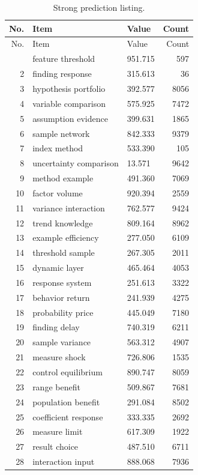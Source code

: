 \documentclass[11pt]{report}
\begin{document}
\begin{longtable}{rllr}\caption{Strong prediction listing.}\label{tab:l6}\\\toprule No. & Item & Value & Count \\ \midrule \endfirsthead\toprule No. & Item & Value & Count \\ \midrule \endhead\bottomrule \endfoot
1 & feature threshold & 951.715 & 597 \\
2 & finding response & 315.613 & 36 \\
3 & hypothesis portfolio & 392.577 & 8056 \\
4 & variable comparison & 575.925 & 7472 \\
5 & assumption evidence & 399.631 & 1865 \\
6 & sample network & 842.333 & 9379 \\
7 & index method & 533.390 & 105 \\
8 & uncertainty comparison & 13.571 & 9642 \\
9 & method example & 491.360 & 7069 \\
10 & factor volume & 920.394 & 2559 \\
11 & variance interaction & 762.577 & 9424 \\
12 & trend knowledge & 809.164 & 8962 \\
13 & example efficiency & 277.050 & 6109 \\
14 & threshold sample & 267.305 & 2011 \\
15 & dynamic layer & 465.464 & 4053 \\
16 & response system & 251.613 & 3322 \\
17 & behavior return & 241.939 & 4275 \\
18 & probability price & 445.049 & 7180 \\
19 & finding delay & 740.319 & 6211 \\
20 & sample variance & 563.312 & 4907 \\
21 & measure shock & 726.806 & 1535 \\
22 & control equilibrium & 890.747 & 8059 \\
23 & range benefit & 509.867 & 7681 \\
24 & population benefit & 291.084 & 8502 \\
25 & coefficient response & 333.335 & 2692 \\
26 & measure limit & 617.309 & 1922 \\
27 & result choice & 487.510 & 6711 \\
28 & interaction input & 888.068 & 7936 \\

\end{longtable}
\end{document}
